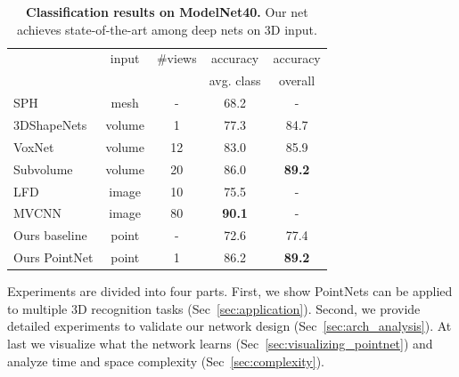 \begin{table}[t!]
    \small
    \centering
    \begin{tabular}[width=\linewidth]{l|c|c|c|c}
    \hline
    ~               & input        & \#views    & accuracy & accuracy \\ 
    ~ & & & avg. class & overall \\ \hline
    SPH~\cite{kazhdan2003rotation}             & mesh        & - & 68.2         & -  \\ \hline
    3DShapeNets~\cite{wu20153d}     & volume       & 1        & 77.3  & 84.7 \\
    VoxNet~\cite{maturana2015voxnet}          & volume       & 12        & 83.0 & 85.9 \\
    Subvolume~\cite{qi2016volumetric}    & volume       & 20      & 86.0  & \textbf{89.2} \\ \hline
    LFD~\cite{wu20153d}             & image        & 10        & 75.5 & -\\
    MVCNN~\cite{su15mvcnn}           & image        & 80        & \textbf{90.1} & -\\ \hline
    Ours baseline  & point    & -     & 72.6  & 77.4\\
    Ours PointNet   & point   & 1        & 86.2 & \textbf{89.2} \\ \hline
    \end{tabular}
    \caption{\textbf{Classification results on ModelNet40.} Our net achieves state-of-the-art among deep nets on 3D input.}
    \label{tab:classification}
\end{table}
\label{sec:exp}
Experiments are divided into four parts. First, we show PointNets can be applied to multiple 3D recognition tasks (Sec~\ref{sec:application}). Second, we provide detailed experiments to validate our network design (Sec~\ref{sec:arch_analysis}). At last we visualize what the network learns (Sec~\ref{sec:visualizing_pointnet}) and analyze time and space complexity (Sec~\ref{sec:complexity}).



